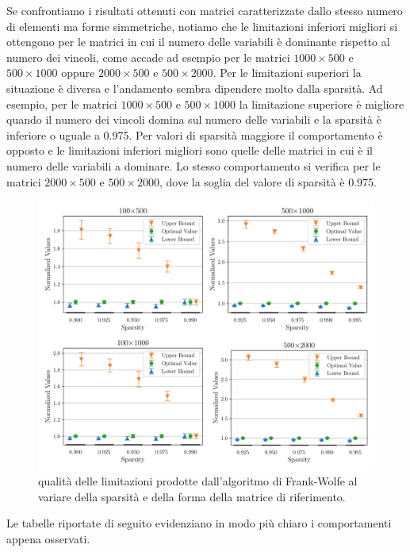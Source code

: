 Se confrontiamo i risultati ottenuti con matrici caratterizzate dallo stesso numero di elementi ma forme simmetriche,
notiamo che le limitazioni inferiori migliori si ottengono per le matrici in cui il numero delle variabili è dominante
rispetto al numero dei vincoli, come accade ad esempio per le matrici \( 1000\times 500 \) e \( 500\times 1000 \) oppure
\( 2000\times 500 \) e \( 500\times 2000 \). Per le limitazioni superiori la situazione è diversa e l'andamento sembra
dipendere molto dalla sparsità. Ad esempio, per le matrici \( 1000\times 500 \) e
\(
    500\times 1000
\)
la limitazione superiore è migliore quando il numero dei vincoli domina sul numero delle variabili e la sparsità è
inferiore o uguale a 0.975. Per valori di sparsità maggiore il comportamento è opposto e le limitazioni inferiori
migliori sono quelle delle matrici in cui è il numero delle variabili a dominare. Lo stesso comportamento si verifica
per le matrici \( 2000\times 500 \) e  \( 500\times 2000 \), dove la soglia del valore di sparsità è 0.975.

\begin{figure}[ht]
    \centering
    \includegraphics[width=\textwidth]{assets/figures/reverse.pdf}
    \caption{qualità delle limitazioni prodotte dall'algoritmo di Frank-Wolfe al variare della sparsità e della forma
    della matrice di riferimento.}
    \label{fig:reverse}
\end{figure}

\noindent
Le tabelle riportate di seguito evidenziano in modo più chiaro i comportamenti appena osservati.

